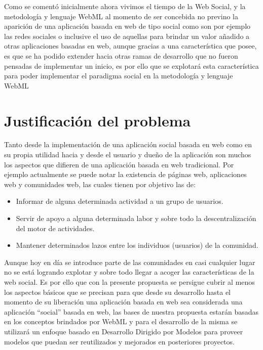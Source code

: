 \documentclass[oneside,12pt,a4paper]{memoir}%
\begin{document}
	Como se coment\'o inicialmente ahora vivimos el tiempo de la Web Social, y la
	metodolog\'ia y lenguaje \ac{WebML} al momento de ser concebida no previno la
	aparici\'on de una aplicaci\'on basada en web de tipo social como son por
	ejemplo las redes sociales o inclusive el uso de aquellas para brindar un valor
	a\~nadido a otras aplicaciones basadas en web, aunque gracias a una
	caracter\'istica que posee, es que se ha podido extender hacia otras ramas de
	desarrollo que no fueron pensadas de implementar un inicio, es por ello que
	se explotar\'a esta caracter\'istica para poder implementar el paradigma
	social en la metodolog\'ia y lenguaje \ac{WebML}
	
	\section{Justificaci\'on del problema}
	\label{sec:Justify}
	Tanto desde la implementaci\'on de una aplicaci\'on social basada en web como en su
	propia utilidad hacia y desde el usuario y due\~no de la aplicaci\'on son muchos
	los aspectos que difieren de una aplicaci\'on basada en web tradicional. Por
	ejemplo actualmente se puede notar la existencia de p\'aginas web, aplicaciones
	web y comunidades web, las cuales tienen por objetivo las de:
	\begin{itemize}
	  \item Informar de alguna determinada actividad a un grupo de usuarios.
	  \item Servir de apoyo a alguna determinada labor y sobre todo la
	  descentralizaci\'on del motor de actividades.
	  \item Mantener determinados lazos entre los individuos (usuarios) de la
	comunidad.
	\end{itemize}
	
	Aunque hoy en d\'ia se introduce parte de las comunidades en casi cualquier
	lugar no se est\'a logrando explotar y sobre todo llegar a acoger las
	caracter\'isticas de la web social. Es por ello que con la presente propuesta
	se persigue cubrir al menos los aspectos b\'asicos que se precisan para que
	desde su desarrollo hasta el momento de su liberaci\'on una aplicaci\'on basada
	en web sea considerada una aplicaci\'on ``social'' basada en web, las bases de
	nuestra propuesta estar\'an basadas en los conceptos brindados por \ac{WebML} y
	para el desarrollo de la misma se utilizar\'a un enfoque basado en Desarrollo
	Dirigido por Modelos para proveer modelos que puedan ser reutilizados y
	mejorados en posteriores proyectos.
	
\end{document}

